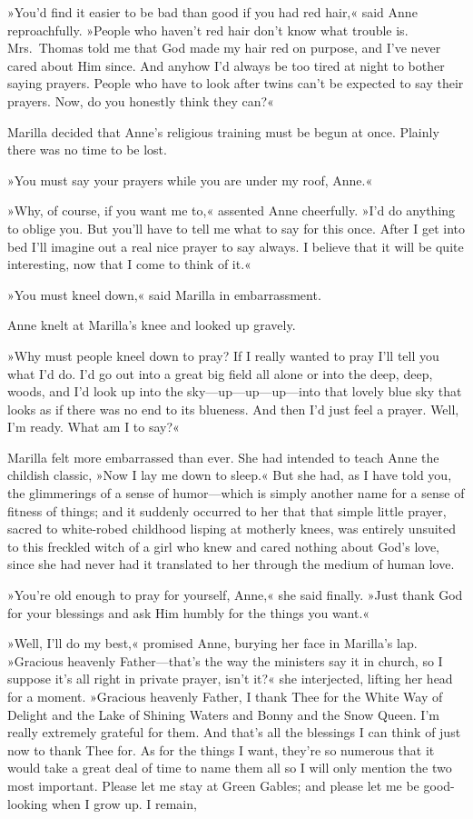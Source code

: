 »You'd find it easier to be bad than good if you had red hair,« said Anne reproachfully. »People who haven't red hair don't know what trouble is. Mrs.~Thomas told me that God made my hair red on purpose, and I've never cared about Him since. And anyhow I'd always be too tired at night to bother saying prayers. People who have to look after twins can't be expected to say their prayers. Now, do you honestly think they can?«

Marilla decided that Anne's religious training must be begun at once. Plainly there was no time to be lost.

»You must say your prayers while you are under my roof, Anne.«

»Why, of course, if you want me to,« assented Anne cheerfully. »I'd do anything to oblige you. But you'll have to tell me what to say for this once. After I get into bed I'll imagine out a real nice prayer to say always. I believe that it will be quite interesting, now that I come to think of it.«

»You must kneel down,« said Marilla in embarrassment.

Anne knelt at Marilla's knee and looked up gravely.

»Why must people kneel down to pray? If I really wanted to pray I'll tell you what I'd do. I'd go out into a great big field all alone or into the deep, deep, woods, and I'd look up into the sky—up—up—up—into that lovely blue sky that looks as if there was no end to its blueness. And then I'd just feel a prayer. Well, I'm ready. What am I to say?«

Marilla felt more embarrassed than ever. She had intended to teach Anne the childish classic, »Now I lay me down to sleep.« But she had, as I have told you, the glimmerings of a sense of humor—which is simply another name for a sense of fitness of things; and it suddenly occurred to her that that simple little prayer, sacred to white-robed childhood lisping at motherly knees, was entirely unsuited to this freckled witch of a girl who knew and cared nothing about God's love, since she had never had it translated to her through the medium of human love.

»You're old enough to pray for yourself, Anne,« she said finally. »Just thank God for your blessings and ask Him humbly for the things you want.«

»Well, I'll do my best,« promised Anne, burying her face in Marilla's lap. »Gracious heavenly Father—that's the way the ministers say it in church, so I suppose it's all right in private prayer, isn't it?« she interjected, lifting her head for a moment. »Gracious heavenly Father, I thank Thee for the White Way of Delight and the Lake of Shining Waters and Bonny and the Snow Queen. I'm really extremely grateful for them. And that's all the blessings I can think of just now to thank Thee for. As for the things I want, they're so numerous that it would take a great deal of time to name them all so I will only mention the two most important. Please let me stay at Green Gables; and please let me be good-looking when I grow up. I remain,

